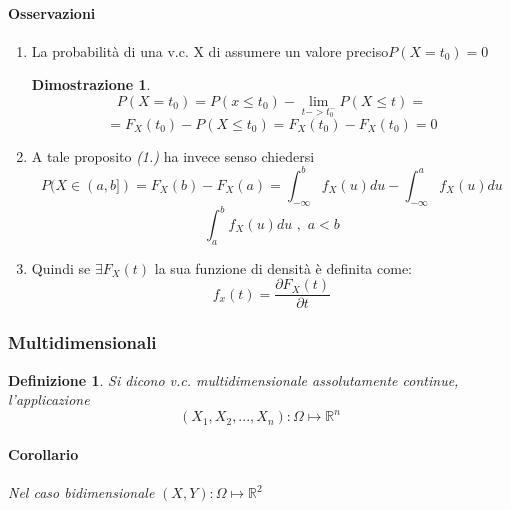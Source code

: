 \documentclass{article}
\newtheorem{definition}{Definizione}[section]
\newtheorem{dimostrazione}{Dimostrazione}
\begin{document}
                \paragraph{Osservazioni}
                \begin{enumerate}
                    \item La probabilità di una v.c. X di assumere un valore preciso$P(X=t_0)=0$
                            \begin{dimostrazione}
                                $$ 
                                    P(X=t_0) = P(x\leq t_0) - \lim_{t->t^-_0}P(X\leq t) =  
                                $$
                                $$
                                    = F_X(t_0) - P(X\leq t_0) = F_X(t_0) -F_X(t_0) = 0
                                $$
                            \end{dimostrazione}
                    
                    \item A tale proposito \textit{(1.)} ha invece senso chiedersi 
                            $$
                                P(X\in(a,b]) = F_X(b)-F_X(a)= \int_{-\infty}^{b} f_X(u)du- \int_{-\infty}^{a} f_X(u)du
                            $$
                            $$
                                \int_a^b  f_X(u)du\,\, , \,\, a<b
                            $$
                    
                    \item Quindi se $\exists F_X(t)$ la sua funzione di densità è definita come: 
                                $$
                                    f_x(t)= \frac{\partial F_X(t)}{\partial t}  
                                $$
                \end{enumerate}{}
                
                
                \subsubsection{Multidimensionali}
                \begin{definition}Si dicono v.c. multidimensionale assolutamente continue, l'applicazione
                $$  
                    (X_1,X_2,...,X_n)\colon \Omega \mapsto \mathbb{R}^n
                $$
                \end{definition}
                \paragraph{Corollario} \textit{Nel caso bidimensionale} $(X,Y)\colon \Omega \mapsto \mathbb{R}^2$
                
\end{document}
